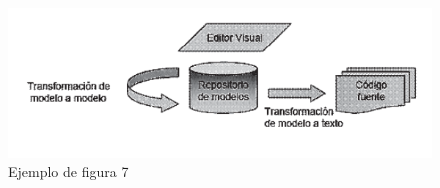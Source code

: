 \begin{figure}[H]
\centering
\includegraphics[scale=0.9]{./Imagenes/modelo7}
\caption{Ejemplo de figura 7}
\label{figura7}
\end{figure}



